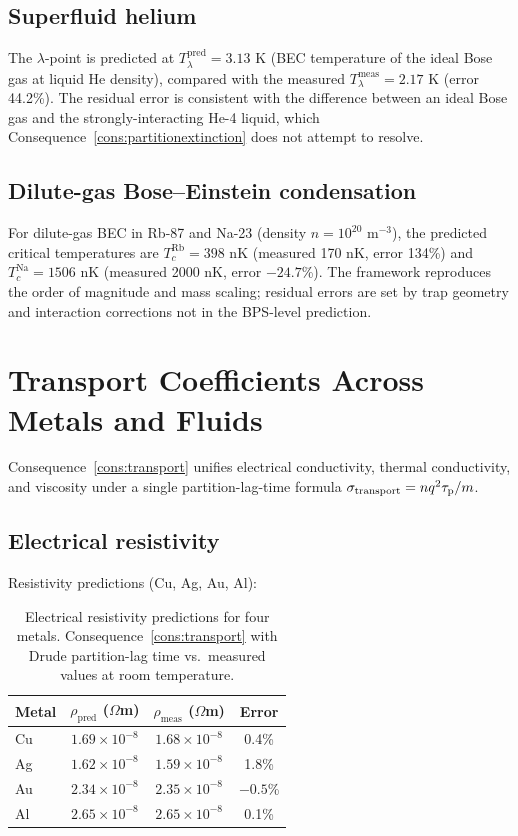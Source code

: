 \subsection{Superfluid helium}

The $\lambda$-point is predicted at
$T_\lambda^{\text{pred}}=3.13$ K (BEC temperature of the ideal Bose gas
at liquid He density), compared with the measured
$T_\lambda^{\text{meas}}=2.17$ K (error 44.2\%).  The residual error is
consistent with the difference between an ideal Bose gas and the
strongly-interacting He-4 liquid, which Consequence~\ref{cons:partitionextinction}
does not attempt to resolve.

\subsection{Dilute-gas Bose--Einstein condensation}

For dilute-gas BEC in Rb-87 and Na-23 (density $n=10^{20}$ m$^{-3}$), the
predicted critical temperatures are
$T_c^{\text{Rb}}=398$ nK (measured 170 nK, error 134\%) and
$T_c^{\text{Na}}=1506$ nK (measured 2000 nK, error $-24.7$\%).
The framework reproduces the order of magnitude and mass scaling; residual
errors are set by trap geometry and interaction corrections not in the
BPS-level prediction.

\section{Transport Coefficients Across Metals and Fluids}
\label{sec:transport-ch25}

Consequence~\ref{cons:transport} unifies electrical conductivity, thermal
conductivity, and viscosity under a single partition-lag-time formula
$\sigma_{\text{transport}}=n q^{2}\tau_{\mathrm{p}}/m$.

\subsection{Electrical resistivity}

Resistivity predictions (Cu, Ag, Au, Al):

\begin{table}[htbp]
\centering
\caption{Electrical resistivity predictions for four metals.
Consequence~\ref{cons:transport} with Drude partition-lag time
vs.\ measured values at room temperature.}
\label{tab:resistivity}
\begin{tabular}{@{}lccc@{}}
\toprule
Metal & $\rho_{\text{pred}}$ ($\Omega$m) &
  $\rho_{\text{meas}}$ ($\Omega$m) & Error \\
\midrule
Cu & $1.69\times 10^{-8}$ & $1.68\times 10^{-8}$ & 0.4\% \\
Ag & $1.62\times 10^{-8}$ & $1.59\times 10^{-8}$ & 1.8\% \\
Au & $2.34\times 10^{-8}$ & $2.35\times 10^{-8}$ & $-0.5$\% \\
Al & $2.65\times 10^{-8}$ & $2.65\times 10^{-8}$ & 0.1\% \\
\bottomrule
\end{tabular}
\end{table}


